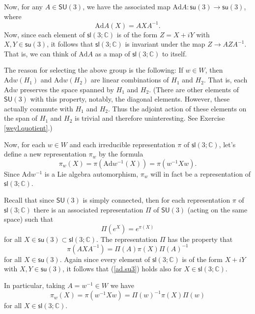 \documentclass{amsbook}
\theoremstyle{plain}
\numberwithin{equation}{chapter}
\numberwithin{theorem}{chapter}
\begin{document}
Now, for any $A\in\mathsf{SU}(3)$, we have the associated map $\mathrm{Ad}%
A:\mathsf{su}(3)\rightarrow\mathsf{su}(3)$, where
\[
\mathrm{Ad}A(X)=AXA^{-1}\text{.}%
\]
Now, since each element of $\mathsf{sl}\left(  3;\mathbb{C}\right)  $ is of
the form $Z=X+iY$ with $X,Y\in\mathsf{su}(3)$, it follows that $\mathsf{sl}%
\left(  3;\mathbb{C}\right)  $ is invariant under the map $Z\rightarrow
AZA^{-1}$. That is, we can think of $\mathrm{Ad}A$ as a map of $\mathsf{sl}%
\left(  3;\mathbb{C}\right)  $ to itself.

The reason for selecting the above group is the following: If $w\in W$, then
$\mathrm{Ad}w(H_{1})$ and $\mathrm{Ad}w(H_{2})$ are linear combinations of
$H_{1}$ and $H_{2}$. That is, each $\mathrm{Ad}w$ preserves the space spanned
by $H_{1}$ and $H_{2} $. (There are other elements of $\mathsf{SU}(3)$ with
this property, notably, the diagonal elements. However, these actually commute
with $H_{1}$ and $H_{2}$. Thus the adjoint action of these elements on the
span of $H_{1}$ and $H_{2}$ is trivial and therefore uninteresting. See
Exercise \ref{weyl.quotient}.)

Now, for each $w\in W$ and each irreducible representation $\pi$ of
$\mathsf{sl}\left(  3;\mathbb{C}\right)  $, let's define a new representation
$\pi_{w}$ by the formula
\[
\pi_{w}(X)=\pi\left(  \mathrm{Ad}w^{-1}(X)\right)  =\pi(w^{-1}Xw)\text{.}%
\]
Since $\mathrm{Ad}w^{-1}$ is a Lie algebra automorphism, $\pi_{w}$ will in
fact be a representation of $\mathsf{sl}\left(  3;\mathbb{C}\right)  $.

Recall that since $\mathsf{SU}(3)$ is simply connected, then for each
representation $\pi$ of $\mathsf{sl}\left(  3;\mathbb{C}\right)  $ there is an
associated representation $\Pi$ of $\mathsf{SU}(3)$ (acting on the same space)
such that
\[
\Pi\left(  e^{X}\right)  =e^{\pi(X)}%
\]
for all $X\in\mathsf{su}(3)\subset\mathsf{sl}\left(  3;\mathbb{C}\right)  $.
The representation $\Pi$ has the property that
\begin{equation}
\pi(AXA^{-1})=\Pi(A)\pi(X)\Pi(A)^{-1}\label{ad.su3}%
\end{equation}
for all $X\in\mathsf{su}(3)$. Again since every element of $\mathsf{sl}\left(
3;\mathbb{C}\right)  $ is of the form $X+iY$ with $X,Y\in\mathsf{su}(3)$, it
follows that (\ref{ad.su3}) holds also for $X\in\mathsf{sl}\left(
3;\mathbb{C}\right)  $.

In particular, taking $A=w^{-1}\in W$ we have
\begin{equation}
\pi_{w}(X)=\pi(w^{-1}Xw)=\Pi(w)^{-1}\pi(X)\Pi(w)\label{ad.weyl}%
\end{equation}
for all $X\in\mathsf{sl}\left(  3;\mathbb{C}\right)  $.
\end{document}

